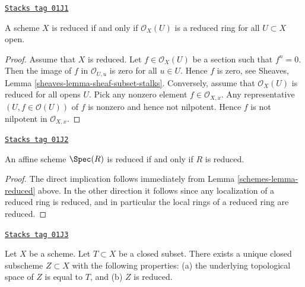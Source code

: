 \begin{lemma}[Reduced]
\label{schemes-lemma-reduced}
\href{https://stacks.math.columbia.edu/tag/01J1}{\texttt{Stacks tag 01J1}}

A scheme $X$ is reduced if and only if $\mathcal{O}_X(U)$
is a reduced ring for all $U \subset X$ open.
\end{lemma}

\begin{proof}
Assume that $X$ is reduced.
Let $f \in \mathcal{O}_X(U)$ be a section such that $f^n = 0$.
Then the image of $f$ in $\mathcal{O}_{U, u}$ is zero for
all $u \in U$. Hence $f$ is zero, see
Sheaves, Lemma \ref{sheaves-lemma-sheaf-subset-stalks}.
Conversely, assume that $\mathcal{O}_X(U)$ is reduced
for all opens $U$. Pick any nonzero element $f \in \mathcal{O}_{X, x}$.
Any representative $(U, f \in \mathcal{O}(U))$  of $f$ is nonzero and
hence not nilpotent. Hence $f$ is not nilpotent in $\mathcal{O}_{X, x}$.
\end{proof}

\begin{lemma}
\label{schemes-lemma-affine-reduced}
\href{https://stacks.math.columbia.edu/tag/01J2}{\texttt{Stacks tag 01J2}}

An affine scheme $\Spec(R)$ is reduced
if and only if $R$ is reduced.
\end{lemma}

\begin{proof}

The direct implication follows immediately from
Lemma \ref{schemes-lemma-reduced} above.
In the other direction it follows since any localization of
a reduced ring is reduced, and in particular the local rings
of a reduced ring are reduced.
\end{proof}

\begin{lemma}
\label{schemes-lemma-reduced-closed-subscheme}
\href{https://stacks.math.columbia.edu/tag/01J3}{\texttt{Stacks tag 01J3}}

Let $X$ be a scheme. Let $T \subset X$ be a closed subset.
There exists a unique closed subscheme $Z \subset X$ with
the following properties: (a) the underlying topological
space of $Z$ is equal to $T$, and (b) $Z$ is reduced.
\end{lemma}

